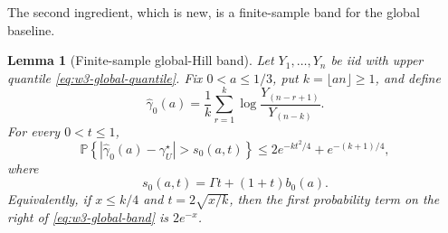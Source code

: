 \documentclass[11pt]{article}
\newtheorem{lemma}[theorem]{Lemma}
\theoremstyle{remark}
\newcommand{\Pp}{\mathbb P}
\begin{document}
The second ingredient, which is new, is a finite-sample band for the global
baseline.

\begin{lemma}[Finite-sample global-Hill band]
\label{lem:w3-global-hill}
Let $Y_1,\ldots,Y_n$ be iid with upper quantile
\eqref{eq:w3-global-quantile}.  Fix $0<a\le1/3$, put
$k=\lfloor an\rfloor\ge1$, and define
\begin{equation}
 \widehat\gamma_0(a)=\frac1k\sum_{r=1}^k
 \log\frac{Y_{(n-r+1)}}{Y_{(n-k)}}.
 \label{eq:w3-global-hill}
\end{equation}
For every $0<t\le1$,
\begin{equation}
 \Pp\left\{|\widehat\gamma_0(a)-\gamma_U^\star|
 >s_0(a,t)\right\}
 \le 2e^{-kt^2/4}+e^{-(k+1)/4},
 \label{eq:w3-global-band}
\end{equation}
where
\begin{equation}
 s_0(a,t)=\Gamma t+(1+t)b_0(a).
 \label{eq:w3-global-radius}
\end{equation}
Equivalently, if $x\le k/4$ and $t=2\sqrt{x/k}$, then the first probability
term on the right of \eqref{eq:w3-global-band} is $2e^{-x}$.
\end{lemma}
\end{document}
